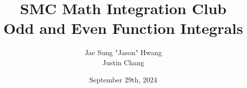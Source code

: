 \documentclass{article}
\title{SMC Math Integration Club\\Odd and Even Function Integrals}
\author{Jae Sung "Jason" Hwang\\Justin Chang}
\date{September 29th, 2024}
\begin{document}
\maketitle
\pagebreak
\end{document}
